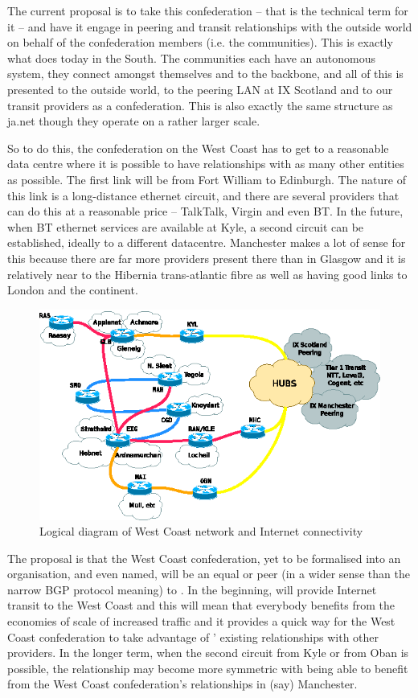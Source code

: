 The current proposal is to take this confederation -- that is the
technical term for it -- and have it engage in peering and transit
relationships with the outside world on behalf of the confederation
members (i.e. the communities). This is exactly what \HUBS{} does
today in the South. The communities each have an autonomous system,
they connect amongst themselves and to the backbone, and all of this
is presented to the outside world, to the peering LAN at IX Scotland
and to our transit providers as a confederation. This is also exactly
the same structure as ja.net though they operate on a rather larger
scale.

So to do this, the confederation on the West Coast has to get to a
reasonable data centre where it is possible to have relationships with
as many other entities as possible. The first link will be from Fort
William to Edinburgh. The nature of this link is a long-distance
ethernet circuit, and there are several providers that can do this at
a reasonable price -- TalkTalk, Virgin and even BT. In the future,
when BT ethernet services are available at Kyle, a second circuit can
be established, ideally to a different datacentre. Manchester makes a
lot of sense for this because there are far more providers present
there than in Glasgow and it is relatively near to the Hibernia
trans-atlantic fibre as well as having good links to London and the
continent.

\begin{figure}
  \includegraphics[width=\textwidth]{wcc.eps}
  \caption{Logical diagram of West Coast network and Internet
    connectivity}
  \label{fig:wcc}
\end{figure}

The proposal is that the West Coast confederation, yet to be
formalised into an organisation, and even named, will be an equal or
peer (in a wider sense than the narrow BGP protocol meaning) to
\HUBS{}. In the beginning, \HUBS{} will provide Internet transit to
the West Coast and this will mean that everybody benefits from the
economies of scale of increased traffic and it provides a quick way
for the West Coast confederation to take advantage of \HUBS{}'
existing relationships with other providers. In the longer term, when
the second circuit from Kyle or from Oban is possible, the
relationship may become more symmetric with \HUBS{} being able to
benefit from the West Coast confederation's relationships in (say)
Manchester.

